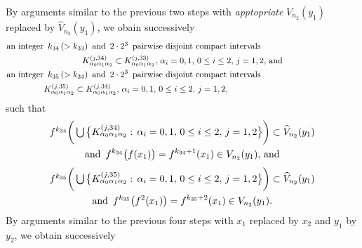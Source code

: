 \documentclass[12pt]{article}
\newcommand{\al}{\alpha}
\begin{document}
\indent By arguments similar to the previous two steps with {\it apptopriate} $V_{n_2}(y_1)$ replaced by $\widehat V_{n_2}(y_1)$, we obain successively
\begin{multline*}
$$
\text{an integer} \,\,\, k_{34} \, (> k_{33}) \,\,\, \text{and} \,\,\, 2 \cdot 2^3 \,\,\, \text{pairwise disjoint compact intervals}\qquad\qquad\qquad\qquad\qquad\quad\,\,\, \\ 
K_{\al_0\al_1\al_2}^{(j,34)} \subset K_{\al_0\al_1\al_2}^{(j,33)}, \, \al_i = 0, 1, \, 0 \le i \le 2, \, j = 1, 2, \, \text{and}  \\
\text{an integer} \,\,\, k_{35} \, (> k_{34}) \,\,\, \text{and} \,\,\, 2 \cdot 2^3 \,\,\, \text{pairwise disjoint compact intervals}\qquad\qquad\qquad\qquad\qquad\quad\,\,\, \\ 
K_{\al_0\al_1\al_2}^{(j,35)} \subset K_{\al_0\al_1\al_2}^{(j,34)}, \, \al_i = 0, 1, \, 0 \le i \le 2, \, j = 1, 2, \qquad\qquad\qquad\qquad\qquad\quad
$$
\end{multline*}
such that
\begin{multline*}
$$
f^{k_{34}}\bigg(\bigcup \big\{ K_{\al_0\al_1\al_2}^{(j,34)}: \, \al_i = 0, 1, \, 0 \le i \le 2, \, j = 1, 2 \big\}\bigg) \subset \widehat  V_{n_2}(y_1) \\ \text{and} \,\,\, f^{k_{34}}\big(f(x_1)\big) = f^{k_{34}+1}(x_1) \in V_{n_2}(y_1), \, \text{and}
$$
\end{multline*}
\begin{multline*}
$$
f^{k_{35}}\bigg(\bigcup \big\{ K_{\al_0\al_1\al_2}^{(j,35)}: \, \al_i = 0, 1, \, 0 \le i \le 2, \, j = 1, 2 \big\}\bigg) \subset \widehat  V_{n_2}(y_1) \\ \text{and} \,\,\, f^{k_{35}}\big(f^2(x_1)\big) = f^{k_{35}+2}(x_1) \in V_{n_2}(y_1).
$$
\end{multline*}
\indent By arguments similar to the previous four steps with $x_1$ replaced by $x_2$ and $y_1$ by $y_2$, we obtain successively
\end{document}
